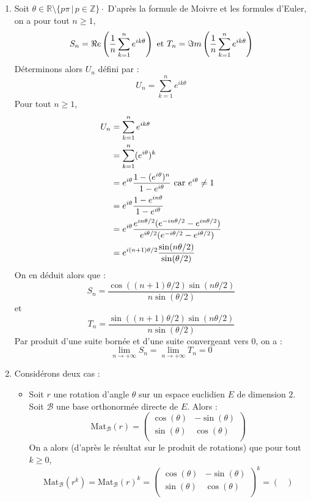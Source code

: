 \documentclass[a4paper,10pt]{report}
\begin{document}
\begin{enumerate}
\item Soit $\theta \in \mathbb{R} \setminus \lbrace p \pi \, \vert \, p \in \mathbb{Z} \rbrace \cdot$ D'après la formule de Moivre et les formules d'Euler, on a pour tout $n \geq 1$,
$$ S_n = \Re e \left(  \dfrac{1}{n} \sum_{k=1}^n e^{ik \theta} \right) \hbox{ et }  T_n = \Im m \left(  \dfrac{1}{n} \sum_{k=1}^n e^{ik \theta} \right)$$
Déterminons alors $U_n$ défini par :
$$ U_n =  \sum_{k=1}^n e^{ik \theta}$$
Pour tout $n \geq 1$,
\begin{align*}
U_n & =  \sum_{k=1}^n e^{ik \theta} \\
& =  \sum_{k=1}^n (e^{i \theta})^k \\
& = e^{i \theta}  \dfrac{1-(e^{i \theta})^n}{1- e^{i \theta}} \hbox{ car } e^{i \theta} \neq 1 \\
& = e^{i \theta} \dfrac{1-e^{i n\theta}}{1- e^{i \theta}} \\
& = e^{i \theta} \dfrac{e^{i n \theta/2} (e^{-i n \theta/2} -e^{i n\theta/2})}{e^{i  \theta/2} (e^{-i  \theta/2} -e^{i \theta/2})} \\
& = e^{i (n+1) \theta/2} \dfrac{\sin(n \theta/2)}{\sin(\theta/2)}
\end{align*}
On en déduit alors que :
$$ S_n =  \dfrac{\cos((n+1) \theta/2)  \sin(n \theta/2)}{n\sin(\theta/2)}$$
et 
$$ T_n = \dfrac{\sin((n+1) \theta/2)  \sin(n \theta/2)}{n\sin(\theta/2)}$$
Par produit d'une suite bornée et d'une suite convergeant vers $0$, on a :
$$ \lim_{n \rightarrow + \infty} S_n = \lim_{n \rightarrow + \infty} T_n =0$$
\item Considérons deux cas :
\begin{itemize}
\item Soit $r$ une rotation d'angle $\theta$ sur un espace euclidien $E$ de dimension $2$. Soit $\mathcal{B}$ une base orthonormée directe de $E$. Alors :
$$ \textrm{Mat}_{\mathcal{B}}(r) = \begin{pmatrix}
\cos(\theta) & - \sin(\theta) \\
\sin(\theta) & \cos(\theta) \\
\end{pmatrix}$$
On a alors (d'après le résultat sur le produit de rotations) que pour tout $k \geq 0$,
$$ \textrm{Mat}_{\mathcal{B}}(r^k) =\textrm{Mat}_{\mathcal{B}}(r)^k = \begin{pmatrix}
\cos(\theta) & - \sin(\theta) \\
\sin(\theta) & \cos(\theta) \\
\end{pmatrix}^k = \begin{pmatrix}

\end{pmatrix}$$
\end{itemize}
\end{enumerate}
\end{document}
